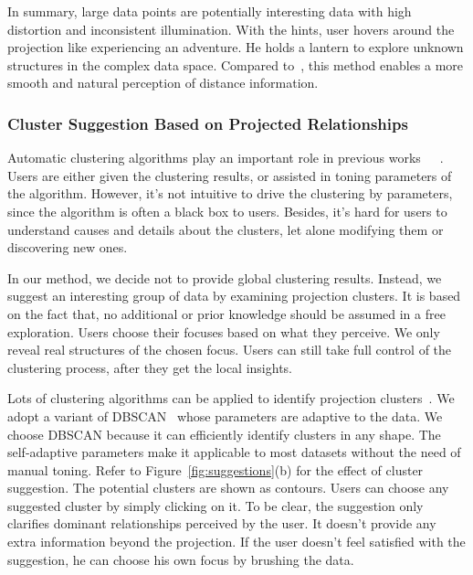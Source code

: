 In summary, large data points are potentially interesting data with high distortion and inconsistent illumination. With the hints, user hovers around the projection like experiencing an adventure. He holds a lantern to explore unknown structures in the complex data space. Compared to~\cite{DBLP:journals/tvcg/StahnkeDMT16}, this method enables a more smooth and natural perception of distance information.

\subsubsection{Cluster Suggestion Based on Projected Relationships}
Automatic clustering algorithms play an important role in previous works~\cite{DBLP:conf/ieeevast/NamHMZI07}~\cite{DBLP:journals/cgf/LeeKCSP12}~\cite{DBLP:journals/cgf/LiuWTBP15}. Users are either given the clustering results, or assisted in toning parameters of the algorithm. However, it's not intuitive to drive the clustering by parameters, since the algorithm is often a black box to users. Besides, it's hard for users to understand causes and details about the clusters, let alone modifying them or discovering new ones.

In our method, we decide not to provide global clustering results. Instead, we suggest an interesting group of data by examining projection clusters. It is based on the fact that, no additional or prior knowledge should be assumed in a free exploration. Users choose their focuses based on what they perceive. We only reveal real structures of the chosen focus. Users can still take full control of the clustering process, after they get the local insights.

Lots of clustering algorithms can be applied to identify projection clusters~\cite{DBLP:conf/ieeevast/Kandogan12}. We adopt a variant of DBSCAN~\cite{zhou2012research} whose parameters are adaptive to the data. We choose DBSCAN because it can efficiently identify clusters in any shape. The self-adaptive parameters make it applicable to most datasets without the need of manual toning. Refer to Figure~\ref{fig:suggestions}(b) for the effect of cluster suggestion. The potential clusters are shown as contours. Users can choose any suggested cluster by simply clicking on it. To be clear, the suggestion only clarifies dominant relationships perceived by the user. It doesn't provide any extra information beyond the projection. If the user doesn't feel satisfied with the suggestion, he can choose his own focus by brushing the data.

